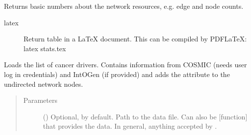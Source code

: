 \documentclass[letterpaper,10pt,english]{sphinxmanual}
\begin{document}
\begin{fulllineitems}
\begin{fulllineitems}
\label{\detokenize{reference:pypath.main.PyPath.basic_stats}}
Returns basic numbers about the network resources, e.g. edge and
node counts.
\begin{description}
\item[{latex}] \leavevmode
Return table in a LaTeX document. This can be compiled by
PDFLaTeX:
latex stats.tex

\end{description}

\end{fulllineitems}


\begin{fulllineitems}
\label{\detokenize{reference:pypath.main.PyPath.basic_stats_intergroup}}
\end{fulllineitems}


\begin{fulllineitems}
\label{\detokenize{reference:pypath.main.PyPath.cancer_drivers_list}}
Loads the list of cancer drivers. Contains information from
COSMIC (needs user log in credentials) and IntOGen (if provided)
and adds the attribute to the undirected network nodes.
\begin{quote}\begin{description}
\item[{Parameters}] \leavevmode
{} () \textendash{} Optional,  by default. Path to the data file. Can
also be {[}function{]} that provides the data. In general,
anything accepted by
.


\end{description}
\end{quote}
\end{fulllineitems}
\end{fulllineitems}
\end{document}
